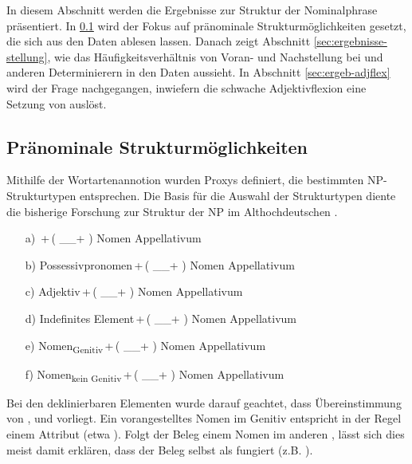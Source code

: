In diesem Abschnitt werden die Ergebnisse zur Struktur der Nominalphrase   präsentiert. In \ref{sec:ergeb-np-struktur} wird der Fokus auf pränominale Strukturmöglichkeiten   gesetzt, die sich aus den Daten ablesen lassen. Danach zeigt Abschnitt \ref{sec:ergebnisse-stellung}, wie das Häufigkeitsverhältnis von Voran- und Nachstellung bei  und anderen Determinierern  in den Daten aussieht. In Abschnitt \ref{sec:ergeb-adjflex} wird der Frage nachgegangen, inwiefern die schwache Adjektivflexion   eine Setzung von   auslöst. 

\subsection{Pränominale Strukturmöglichkeiten}\label{sec:ergeb-np-struktur}

Mithilfe der Wortartenannotion wurden Proxys  definiert, die bestimmten NP-Strukturtypen  entsprechen. Die Basis für die Auswahl der Strukturtypen diente die bisherige Forschung zur Struktur der NP  im Althochdeutschen \parencite[vor allem][]{Oubouzar1989}. 

\begin{itemize}
\item [a)] \,+\,( \_\_+ )  Nomen Appellativum
\item [b)] Possessivpronomen\,+\,( \_\_+ )  Nomen Appellativum
\item [c)] Adjektiv\,+\,( \_\_+ )  Nomen Appellativum
\item [d)] Indefinites Element\,+\,( \_\_+ )   Nomen Appellativum
\item [e)] Nomen\textsubscript{Genitiv}\,+\,( \_\_+ )   Nomen Appellativum
\item [f)] Nomen\textsubscript{kein Genitiv}\,+\,( \_\_+ )   Nomen Appellativum
\end{itemize}

\noindent 
Bei den deklinierbaren Elementen wurde darauf geachtet, dass Übereinstimmung von ,  und  vorliegt. Ein vorangestelltes Nomen im Genitiv entspricht in der Regel einem Attribut  (etwa ). Folgt der Beleg einem Nomen im anderen , lässt sich dies meist damit erklären, dass  der Beleg selbst als  fungiert (z.B. ). 
 

